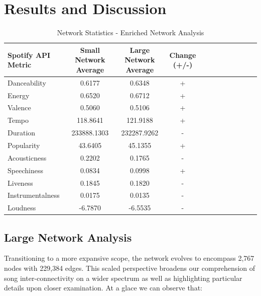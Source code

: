 \documentclass[conference]{IEEEtran}
\begin{document}

\section{Results and Discussion}

\begin{table}[hbt!]
\centering
\caption{Network Statistics - Enriched Network Analysis}
\label{table:kysymys}
\begin{tabularx}{\textwidth}{@{} l *{10}{C} c @{}}

        \toprule
        Spotify API Metric & Small Network Average & Large Network Average & Change (+/-)\\
        \midrule
        Danceability & 0.6177 & 0.6348 & + \\
        Energy & 0.6520 & 0.6712 & + \\
        Valence &  0.5060 & 0.5106 & + \\
        Tempo & 118.8641 & 121.9188 & + \\
        Duration & 233888.1303 & 232287.9262 & - \\
        Popularity & 43.6405 & 45.1355 & + \\
        Acousticness & 0.2202 & 0.1765 & - \\
        Speechiness & 0.0834 & 0.0998 & + \\
        Liveness & 0.1845 & 0.1820 & - \\
        Instrumentalness & 0.0175 & 0.0135 & - \\
        Loudness & -6.7870 & -6.5535 & - \\
        \bottomrule
        
    \end{tabularx}

\end{table}

\subsection{Large Network Analysis}

Transitioning to a more expansive scope, the network evolves to encompass 2,767 nodes with 229,384 edges. This scaled perspective broadens our comprehension of song inter-connectivity on a wider spectrum as well as highlighting particular details upon closer examination. At a glace we can observe that: \\
\end{document}
